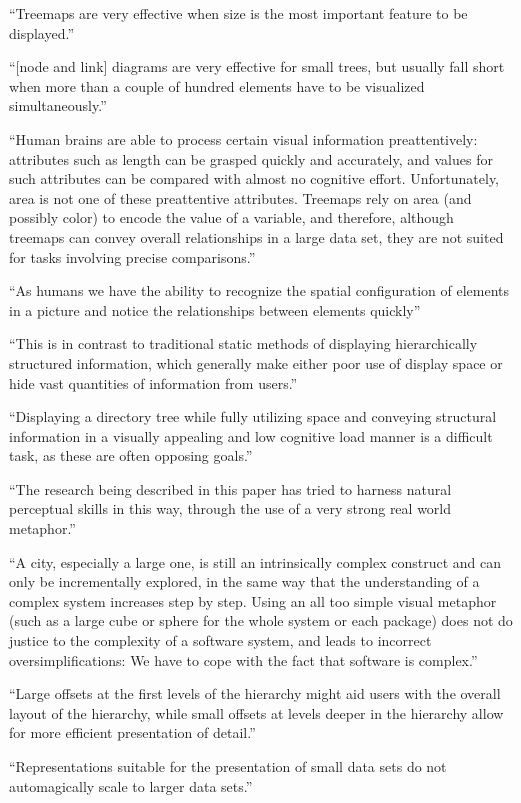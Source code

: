 \enquote{Treemaps are very effective when size is the most important feature to be displayed.}\cite[2]{bruls2000squarified}


\enquote{[node and link] diagrams are very effective for small trees, but usually fall short when more than a couple of hundred elements have to be visualized simultaneously.}\cite[2]{bruls2000squarified}

\enquote{Human brains are able to process certain visual information preattentively: attributes such as length can be grasped quickly and accurately, and values for such attributes can be compared with almost no cognitive effort. Unfortunately, area is not one of these preattentive attributes. Treemaps rely on area (and possibly color) to encode the value of a variable, and therefore, although treemaps can convey overall relationships in a large data set, they are not suited for tasks involving precise comparisons.}\cite{laubheimer_2019}

\enquote{As humans we have the ability to recognize the spatial configuration of elements in a picture and notice the relationships between elements quickly}\cite[2]{johnson1998tree}

\enquote{This is in contrast to traditional static methods of displaying
hierarchically structured information, which generally make either poor use of
display space or hide vast quantities of information from users.}\cite[2]{johnson1998tree}

\enquote{Displaying a directory tree while fully utilizing space and conveying structural information in a visually appealing and low cognitive load manner is a difficult task, as these are often opposing goals.}\cite[8]{johnson1998tree}

\enquote{The research being described in this paper has tried to harness natural perceptual skills in this way, through the use of a very strong real world metaphor.}\cite[2]{virtualButVisibleMunro}

\enquote{A city, especially a large one, is still an intrinsically complex construct and can only be incrementally explored, in the same way that the understanding of a complex system increases step by step. Using an all too simple visual metaphor (such as a large cube or sphere for the whole system or each package) does not do justice to the complexity of a software system, and leads to incorrect oversimplifications: We have to cope with the fact that software is complex.}\cite[2]{codeCity1}

\enquote{Large offsets at the first levels of the hierarchy might aid users with the overall layout of the hierarchy, while small offsets at levels deeper in the hierarchy allow for more efficient presentation of detail.}\cite[52]{johnson1993treemapsPhd}

\enquote{Representations suitable for the presentation of small data sets do not automagically scale to larger data sets.}\cite[161]{johnson1993treemapsPhd}